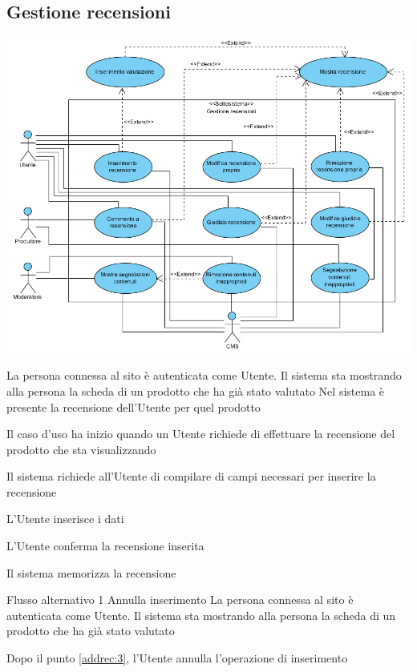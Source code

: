 \subsection{Gestione recensioni}
\begin{center}
   \includegraphics[width=\textwidth]{assets/visualParadigm/cu/GestioneRecensioni}
\end{center}
{}
{La persona connessa al sito è autenticata come Utente. Il sistema sta mostrando alla persona la scheda di un prodotto che ha già stato valutato}
{Nel sistema è presente la recensione dell'Utente per quel prodotto}
{\begin{enumCU}
	\item Il caso d'uso ha inizio quando un Utente richiede di effettuare la recensione del prodotto che sta visualizzando
	\item Il sistema richiede all'Utente di compilare di campi necessari per inserire la recensione
	\item L'Utente inserisce i dati\label{addrec:3}
	\item L'Utente conferma la recensione inserita
	\item Il sistema memorizza la recensione
\end{enumCU}}
%
{Flusso alternativo 1}%
{Annulla inserimento}%
{La persona connessa al sito è autenticata come Utente. Il sistema sta mostrando alla persona la scheda di un prodotto che ha già stato valutato}%
{\postNulle}%
{\begin{enumCU}
		\item Dopo il punto \ref{addrec:3}, l'Utente annulla l'operazione di inserimento
	\end{enumCU}}%

